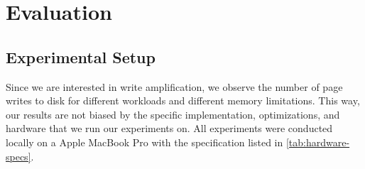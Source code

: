 \chapter{Evaluation}
\label{chap:evaluation}





\section{Experimental Setup}
Since we are interested in write amplification, we observe the number of page writes to disk for different workloads and different memory limitations.
This way, our results are not biased by the specific implementation, optimizations, and hardware that we run our experiments on.
All experiments were conducted locally on a Apple MacBook Pro with the specification listed in \autoref{tab:hardware-specs}.

